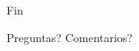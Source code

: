 \documentclass[
	11pt, %
]{beamer}
\begin{document}

\begin{frame}[plain] %
	\begin{center}
		{\Huge Fin}
		
		\bigskip\bigskip %
		
		{\LARGE Preguntas? Comentarios?}
	\end{center}
\end{frame}

\end{document}
